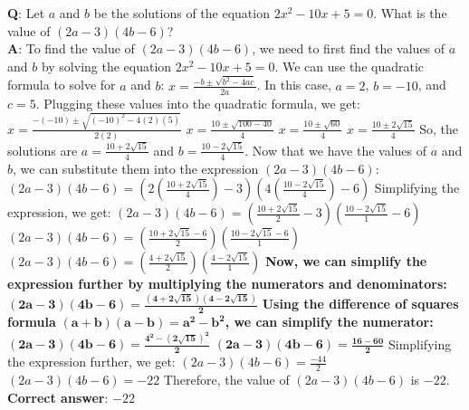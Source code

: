 \begin{tcolorbox}[colback=blue!5!white,colframe=blue!75!black,title=MATH example (\llamainstruct)]
\textbf{Q}:  Let $a$ and $b$ be the solutions of the equation $2x^2-10x+5=0$. What is the value of $(2a-3)(4b-6)$?\\

\textbf{A}: To find the value of $(2a-3)(4b-6)$, we need to first find the values of $a$ and $b$ by solving the equation $2x^2-10x+5=0$. We can use the quadratic formula to solve for $a$ and $b$: $x = \frac{-b\pm\sqrt{b^2-4ac}}{2a}$. In this case, $a=2$, $b=-10$, and $c=5$. Plugging these values into the quadratic formula, we get: $x = \frac{-(-10)\pm\sqrt{(-10)^2-4(2)(5)}}{2(2)}$ $x = \frac{10\pm\sqrt{100-40}}{4}$ $x = \frac{10\pm\sqrt{60}}{4}$ $x = \frac{10\pm2\sqrt{15}}{4}$ So, the solutions are $a = \frac{10+2\sqrt{15}}{4}$ and $b = \frac{10-2\sqrt{15}}{4}$. Now that we have the values of $a$ and $b$, we can substitute them into the expression $(2a-3)(4b-6)$: $(2a-3)(4b-6) = (2(\frac{10+2\sqrt{15}}{4})-3)(4(\frac{10-2\sqrt{15}}{4})-6)$ Simplifying the expression, we get: $(2a-3)(4b-6) = (\frac{10+2\sqrt{15}}{2}-3)(\frac{10-2\sqrt{15}}{1}-6)$ $(2a-3)(4b-6) = (\frac{10+2\sqrt{15}-6}{2})(\frac{10-2\sqrt{15}-6}{1})$ $(2a-3)(4b-6) = (\frac{4+2\sqrt{15}}{2})(\frac{4-2\sqrt{15}}{1})$ \textbf{Now, we can simplify the expression further by multiplying the numerators and denominators:} $\mathbf{(2a-3)(4b-6) = \frac{(4+2\sqrt{15})(4-2\sqrt{15})}{2}}$ \textbf{Using the difference of squares formula} $\mathbf{(a+b)(a-b) = a^2-b^2}$\textbf{, we can simplify the numerator:} $\mathbf{(2a-3)(4b-6) = \frac{4^2-(2\sqrt{15})^2}{2}}$ $\mathbf{(2a-3)(4b-6) = \frac{16-60}{2}}$ Simplifying the expression further, we get: $(2a-3)(4b-6) = \frac{-44}{2}$ $(2a-3)(4b-6) = -22$ Therefore, the value of $(2a-3)(4b-6)$ is $-22$.\\

\textbf{Correct answer}: $-22$
\end{tcolorbox}


